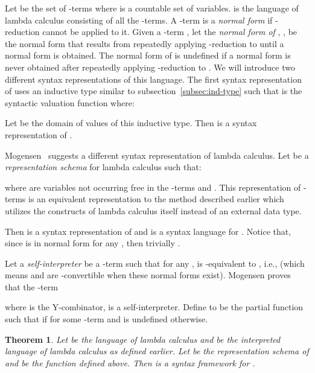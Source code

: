\documentclass[11pt,fleqn]{article}
\newcommand{\bsp}{\begin{sloppypar}}
\newcommand{\esp}{\end{sloppypar}}
\newtheorem{thm}{Theorem}[subsection]
\begin{document}
Let  be
the set of -terms where  is a countable set of
variables.  is the language of lambda calculus consisting of
all the -terms.  A -term is a \emph{normal form} if
-reduction cannot be applied to it.  Given a -term
, let the \emph{normal form of }, , be the normal
form that results from repeatedly applying -reduction to 
until a normal form is obtained.  The normal form of  is undefined
if a normal form is never obtained after repeatedly applying
-reduction to .  We will introduce two different syntax
representations of this language. The first syntax representation of
 uses an inductive type similar to
subsection~\ref{subsec:ind-type} such that  is the syntactic
valuation function where: \setcounter{equation}{0}

\noindent 
Let  be the domain of values of this inductive type.
Then  is a syntax representation of .

Mogensen~\cite{Mogensen94} suggests a different syntax representation
of lambda calculus. Let  be a {\em representation schema} for lambda calculus such
that: 
\setcounter{equation}{0}

\noindent 
where  are variables not occurring free in the -terms
 and . This representation of -terms is an equivalent
representation to the method described earlier which utilizes the
constructs of lambda calculus itself instead of an external data type.

Then  is a syntax
representation of  and  is a
syntax language for . Notice that, since 
is in normal form for any , then trivially
.

Let a {\em self-interpreter}  be a -term such that for any
,  is -equivalent to ,
i.e.,  (which means  and  are -convertible when these
normal forms exist).  Mogensen proves that the -term

\noindent where  is the Y-combinator, is a self-interpreter.
Define  to be the partial
function such that  if  for
some -term  and is undefined otherwise.

\iffalse
The immediate implementation of  for the syntax representation  is as follows:
\setcounter{equation}{0}

\fi

\begin{thm}\bsp
Let  be the language of lambda calculus and  be the interpreted language of
lambda calculus as defined earlier. Let  be the
representation schema of  and  be the function
defined above.  Then  is a syntax framework for
. \esp
\end{thm}
\end{document}
